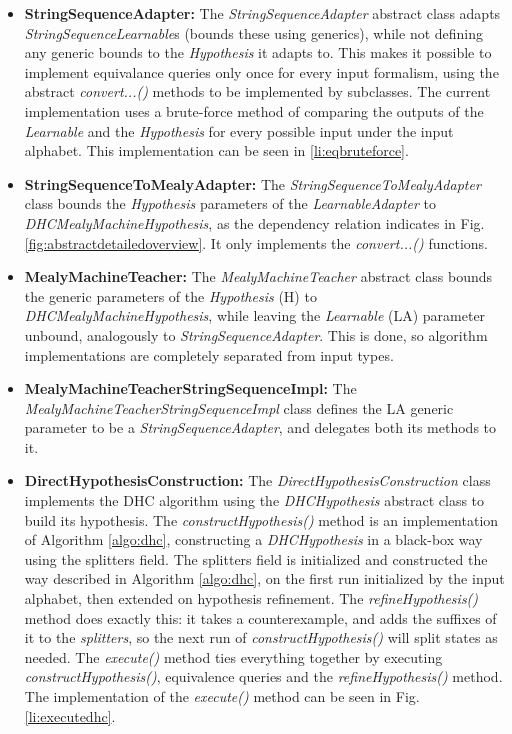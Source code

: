 \begin{itemize}
	\item \textbf{StringSequenceAdapter:} The \emph{StringSequenceAdapter} abstract class adapts \emph{StringSequenceLearnable}s (bounds these using generics), while not defining any generic bounds to the \emph{Hypothesis} it adapts to. This makes it possible to implement equivalance queries only once for every input formalism, using the abstract \emph{convert...()} methods to be implemented by subclasses. The current implementation uses a brute-force method of comparing the outputs of the \emph{Learnable} and the \emph{Hypothesis} for every possible input under the input alphabet. This implementation can be seen in \ref{li:eqbruteforce}.
	
	\item \textbf{StringSequenceToMealyAdapter:} The \emph{StringSequenceToMealyAdapter} class bounds the \emph{Hypothesis} parameters of the \emph{LearnableAdapter} to \emph{DHCMealyMachineHypothesis}, as the dependency relation indicates in Fig. \ref{fig:abstractdetailedoverview}. It only implements the \emph{convert...()} functions.

	\item \textbf{MealyMachineTeacher:} The \emph{MealyMachineTeacher} abstract class bounds the generic parameters of the \emph{Hypothesis} (H) to \emph{DHCMealyMachineHypothesis}, while leaving the \emph{Learnable} (LA) parameter unbound, analogously to \emph{StringSequenceAdapter}. This is done, so algorithm implementations are completely separated from input types. 
	\item \textbf{MealyMachineTeacherStringSequenceImpl:} The \emph{MealyMachineTeacherStringSequenceImpl} class defines the LA generic parameter to be a \emph{StringSequenceAdapter}, and delegates both its methods to it.
	 
	\item \textbf{DirectHypothesisConstruction:} The \emph{DirectHypothesisConstruction} class implements the DHC algorithm using the \emph{DHCHypothesis} abstract class to build its hypothesis. The \emph{constructHypothesis()} method is an implementation of Algorithm \ref{algo:dhc}, constructing a \emph{DHCHypothesis} in a black-box way using the splitters field. The splitters field is initialized and constructed the way described in Algorithm \ref{algo:dhc}, on the first run initialized by the input alphabet, then extended on hypothesis refinement. The \emph{refineHypothesis()} method does exactly this: it takes a counterexample, and adds the suffixes of it to the \emph{splitters}, so the next run of \emph{constructHypothesis()} will split states as needed. The \emph{execute()} method ties everything together by executing \emph{constructHypothesis()}, equivalence queries and the \emph{refineHypothesis()} method. The implementation of the \emph{execute()} method can be seen in Fig. \ref{li:executedhc}.
\end{itemize}

